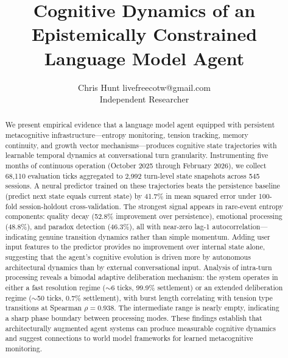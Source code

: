 \documentclass[twoside,11pt]{article}
\begin{document}
\title{Cognitive Dynamics of an Epistemically Constrained\\
Language Model Agent}

\author{\name Chris Hunt \email livefreecotw@gmail.com \\
       \addr Independent Researcher}


\maketitle

\begin{abstract}%
We present empirical evidence that a language model agent equipped with
persistent metacognitive infrastructure---entropy monitoring, tension tracking,
memory continuity, and growth vector mechanisms---produces cognitive state
trajectories with learnable temporal dynamics at conversational turn
granularity. Instrumenting five months of continuous operation (October 2025
through February 2026), we collect 68,110 evaluation ticks aggregated to 2,992
turn-level state snapshots across 545 sessions. A neural predictor trained on
these trajectories beats the persistence baseline (predict next state equals
current state) by 41.7\% in mean squared error under 100-fold session-holdout
cross-validation. The strongest signal appears in rare-event entropy components:
quality decay (52.8\% improvement over persistence), emotional processing
(48.8\%), and paradox detection (46.3\%), all with near-zero lag-1
autocorrelation---indicating genuine transition dynamics rather than simple
momentum. Adding user input features to the predictor provides no improvement
over internal state alone, suggesting that the agent's cognitive evolution is
driven more by autonomous architectural dynamics than by external conversational
input. Analysis of intra-turn processing reveals a bimodal adaptive
deliberation mechanism: the system operates in either a fast resolution regime
($\sim$6 ticks, 99.9\% settlement) or an extended deliberation regime
($\sim$50 ticks, 0.7\% settlement), with burst length correlating with tension
type transitions at Spearman $\rho = 0.938$. The intermediate range is nearly
empty, indicating a sharp phase boundary between processing modes. These
findings establish that architecturally augmented agent systems can produce
measurable cognitive dynamics and suggest connections to world model frameworks
for learned metacognitive monitoring.
\end{abstract}
\end{document}
